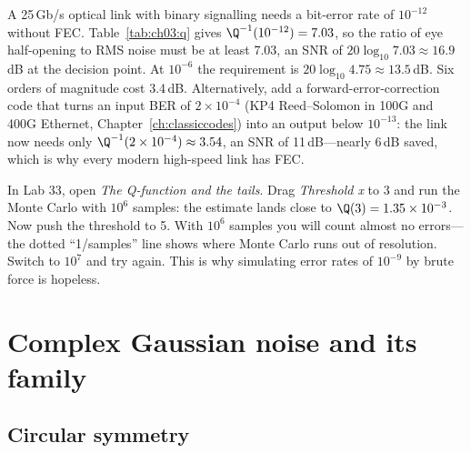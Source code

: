 \begin{worked}
A 25\,Gb/s optical link with binary signalling needs a bit-error rate of $10^{-12}$ without FEC.
Table~\ref{tab:ch03:q} gives $\Q^{-1}(10^{-12})=7.03$, so the ratio of eye half-opening to RMS noise
must be at least 7.03, an SNR of $20\log_{10}7.03\approx16.9$\,dB at the decision point. At
$10^{-6}$ the requirement is $20\log_{10}4.75\approx13.5$\,dB. Six orders of magnitude cost
3.4\,dB. Alternatively, add a forward-error-correction code that turns an input BER of
$2\times10^{-4}$ (KP4 Reed--Solomon in 100G and 400G Ethernet, Chapter~\ref{ch:classiccodes}) into
an output below $10^{-13}$: the link now needs only $\Q^{-1}(2\times10^{-4})\approx3.54$, an SNR of
11\,dB---nearly 6\,dB saved, which is why every modern high-speed link has FEC.
\end{worked}


\begin{tryit}
In Lab 33, open \emph{The Q-function and the tails}. Drag \emph{Threshold x} to 3 and run the Monte
Carlo with $10^6$ samples: the estimate lands close to $\Q(3)=1.35\times10^{-3}$. Now push the
threshold to 5. With $10^6$ samples you will count almost no errors---the dotted ``1/samples'' line
shows where Monte Carlo runs out of resolution. Switch to $10^7$ and try again. This is why
simulating error rates of $10^{-9}$ by brute force is hopeless.
\end{tryit}

\section{Complex Gaussian noise and its family}
\label{sec:ch03:complex}


\subsection{Circular symmetry}

